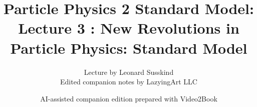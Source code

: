 \documentclass[11pt,oneside]{book}
\begin{document}
\frontmatter
\title{Particle Physics 2 Standard Model: Lecture 3 : New Revolutions in Particle Physics: Standard Model}
\author{Lecture by Leonard Susskind\\Edited companion notes by LazyingArt LLC}
\date{AI-assisted companion edition prepared with Video2Book}
\maketitle
\clearpage
\mainmatter

\end{document}
